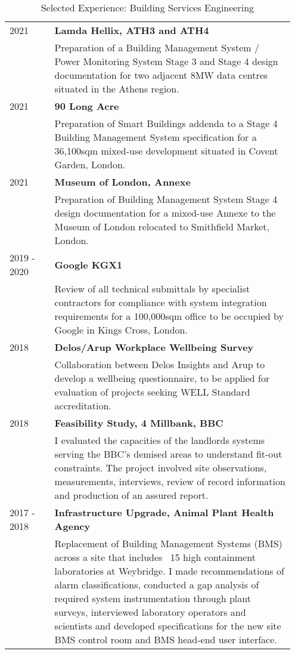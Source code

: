 \documentclass[11pt, oneside]{article}   	%
\begin{document}
\begin{table}[h]
\vspace{-5mm}
\caption*{Selected Experience: Building Services Engineering}
\vspace{-5mm}
\small
\begin{center}
\begin{tabular}{p{0.15\linewidth} p{0.8\linewidth}}
\hline
2021&\textbf{Lamda Hellix, ATH3 and ATH4} \\
&Preparation of a Building Management System / Power Monitoring System Stage 3 and Stage 4 design documentation for two adjacent 8MW data centres situated in the Athens region.\\
2021 &\textbf{90 Long Acre} \\
&Preparation of Smart Buildings addenda to a Stage 4 Building Management System specification for a 36,100sqm mixed-use development situated in Covent Garden, London.\\
2021&\textbf{Museum of London, Annexe} \\
&Preparation of Building Management System Stage 4 design documentation for a mixed-use Annexe to the Museum of London relocated to Smithfield Market, London.\\
2019 - 2020&\textbf{Google KGX1} \\
&Review of all technical submittals by specialist contractors for compliance with system integration requirements for a 100,000sqm office to be occupied by Google in Kings Cross, London.\\
2018&\textbf{Delos/Arup Workplace Wellbeing Survey} \\
&Collaboration between Delos Insights and Arup to develop a wellbeing questionnaire, to be applied for evaluation of projects seeking WELL Standard accreditation. \\
2018&\textbf{Feasibility Study, 4 Millbank, BBC} \\
&I evaluated the capacities of the landlords systems serving the BBC’s demised areas to understand fit-out constraints. The project involved site observations, measurements, interviews, review of record information and production of an assured report. \\
2017 - 2018&\textbf{Infrastructure Upgrade, Animal Plant Health Agency} \\
&Replacement of Building Management Systems (BMS) across a site that includes ~15 high containment laboratories at Weybridge. I made recommendations of alarm classifications, conducted a gap analysis of required system instrumentation through plant surveys, interviewed laboratory operators and scientists and developed specifications for the new site BMS control room and BMS head-end user interface. \\

\end{tabular}
\end{center}
\end{table}
\end{document}
